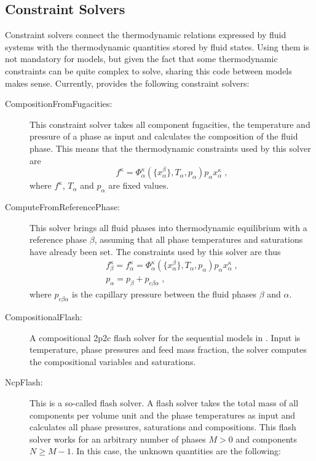 \subsection{Constraint Solvers}
\label{sec:constraint_solvers}

Constraint solvers connect the thermodynamic relations expressed by
fluid systems with the thermodynamic quantities stored by fluid
states. Using them is not mandatory for models, but given the fact
that some thermodynamic constraints can be quite complex to solve,
sharing this code between models makes sense. Currently, \Dumux
provides the following constraint solvers:
\begin{description}
\item[CompositionFromFugacities:] This constraint solver takes all
  component fugacities, the temperature and pressure of a phase as
  input and calculates the composition of the fluid phase. This means
  that the thermodynamic constraints used by this solver are
  \[
  f^\kappa = \Phi^\kappa_\alpha(\{x^\beta_\alpha \}, T_\alpha, p_\alpha)  p_\alpha x^\kappa_\alpha\;,
  \]
  where ${f^\kappa}$, $T_\alpha$ and $p_\alpha$ are fixed values.
\item[ComputeFromReferencePhase:] This solver brings all
  fluid phases into thermodynamic equilibrium with a reference phase
  $\beta$, assuming that all phase temperatures and saturations have
  already been set. The constraints used by this solver are thus
  \begin{eqnarray*}
  f^\kappa_\beta = f^\kappa_\alpha = \Phi^\kappa_\alpha(\{x^\beta_\alpha \}, T_\alpha, p_\alpha)  p_\alpha x^\kappa_\alpha\;, \\
  p_\alpha = p_\beta + p_{c\beta\alpha} \;,
  \end{eqnarray*}
  where $p_{c\beta\alpha}$ is the capillary pressure between the
  fluid phases $\beta$ and $\alpha$.
\item[CompositionalFlash:] A compositional 2p2c flash solver for the
sequential models in \Dumux. Input is temperature, phase pressures
and feed mass fraction, the solver computes the compositional variables and
saturations.
\item[NcpFlash:] This is a so-called flash solver. A flash solver
  takes the total mass of all components per volume unit and the phase
  temperatures as input and calculates all phase pressures,
  saturations and compositions. This flash solver works for an
  arbitrary number of phases $M > 0$ and components $N \geq M - 1$. In
  this case, the unknown quantities are the following:

\end{description}
